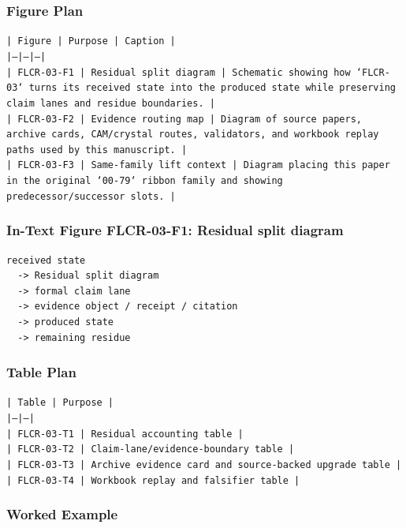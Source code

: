 \documentclass[11pt]{article}
\begin{document}
\subsubsection*{Figure Plan}

\noindent\texttt{| Figure | Purpose | Caption |}\\
\noindent\texttt{|---|---|---|}\\
\noindent\texttt{| FLCR-03-F1 | Residual split diagram | Schematic showing how `FLCR-03` turns its received state into the produced state while preserving claim lanes and residue boundaries. |}\\
\noindent\texttt{| FLCR-03-F2 | Evidence routing map | Diagram of source papers, archive cards, CAM/crystal routes, validators, and workbook replay paths used by this manuscript. |}\\
\noindent\texttt{| FLCR-03-F3 | Same-family lift context | Diagram placing this paper in the original `00-79` ribbon family and showing predecessor/successor slots. |}\\

\subsubsection*{In-Text Figure FLCR-03-F1: Residual split diagram}

\begin{verbatim}
received state
  -> Residual split diagram
  -> formal claim lane
  -> evidence object / receipt / citation
  -> produced state
  -> remaining residue
\end{verbatim}

\subsubsection*{Table Plan}

\noindent\texttt{| Table | Purpose |}\\
\noindent\texttt{|---|---|}\\
\noindent\texttt{| FLCR-03-T1 | Residual accounting table |}\\
\noindent\texttt{| FLCR-03-T2 | Claim-lane/evidence-boundary table |}\\
\noindent\texttt{| FLCR-03-T3 | Archive evidence card and source-backed upgrade table |}\\
\noindent\texttt{| FLCR-03-T4 | Workbook replay and falsifier table |}\\

\subsubsection*{Worked Example}
\end{document}
